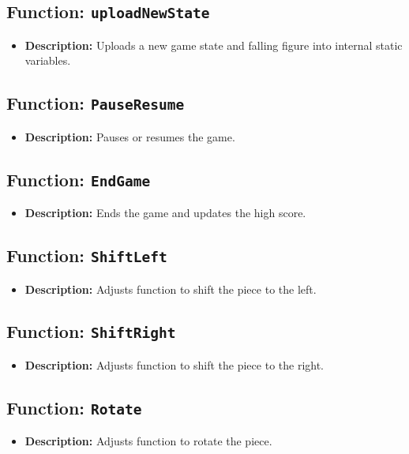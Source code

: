 \documentclass{article}
\begin{document}
\subsection{Function: \texttt{uploadNewState}}
\begin{itemize}
    \item \textbf{Description:} Uploads a new game state and falling figure into internal static variables.
\end{itemize}

\subsection{Function: \texttt{PauseResume}}
\begin{itemize}
    \item \textbf{Description:} Pauses or resumes the game.
\end{itemize}

\subsection{Function: \texttt{EndGame}}
\begin{itemize}
    \item \textbf{Description:} Ends the game and updates the high score.
\end{itemize}

\subsection{Function: \texttt{ShiftLeft}}
\begin{itemize}
    \item \textbf{Description:} Adjusts function to shift the piece to the left.
\end{itemize}

\subsection{Function: \texttt{ShiftRight}}
\begin{itemize}
    \item \textbf{Description:} Adjusts function to shift the piece to the right.
\end{itemize}

\subsection{Function: \texttt{Rotate}}
\begin{itemize}
    \item \textbf{Description:} Adjusts function to rotate the piece.
\end{itemize}
\end{document}
